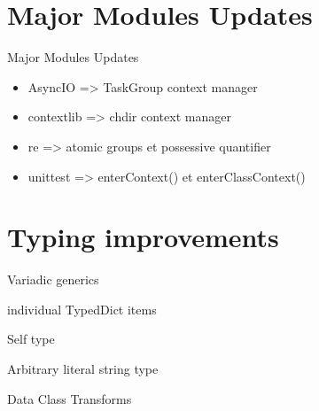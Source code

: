 \documentclass[aspectratio=169, xetex, 12pt]{beamer}
\begin{document}
    \section{Major Modules Updates}
    \begin{frame}{Major Modules Updates}
        \begin{minipage}{0.49\paperwidth}
            \begin{block}{}
                \begin{itemize}
                    \item AsyncIO => TaskGroup context manager
                    \item contextlib => chdir context manager
                    \item re => atomic groups et possessive quantifier
                    \item unittest => enterContext() et enterClassContext()
                \end{itemize}
            \end{block}
        \end{minipage}
        \hspace{0.01cm}
        \begin{minipage}{0.49\paperwidth}
            \begin{block}{}

            \end{block}
        \end{minipage}
    \end{frame}

    \section{Typing improvements}

    \begin{frame}{Variadic generics}
    \end{frame}

    \begin{frame}{individual TypedDict items}
    \end{frame}

    \begin{frame}{Self type}
    \end{frame}

    \begin{frame}{Arbitrary literal string type}
    \end{frame}

    \begin{frame}{Data Class Transforms}
    \end{frame}
\end{document}
